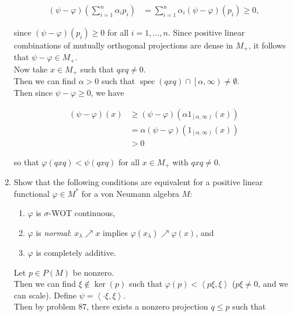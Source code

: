 \documentclass[a4paper,10pt]{report}
\DeclareMathOperator{\spec}{spec} %
\begin{document}
\begin{enumerate}
		\begin{align*}
				\left( \psi - \varphi \right) \left( \sum_{i = 1}^n \alpha_i p_i \right)%
				&= \sum_{i = 1}^n \alpha_i \left( \psi - \varphi \right) \left( p_i \right) \geq 0,
		\end{align*}

		since $\left( \psi - \varphi \right) \left( p_i \right) \geq 0$ for all $i = 1 , \ldots , n$.  Since positive linear combinations of mutually orthogonal projections are dense in $M_+$, it follows that $\psi - \varphi \in M_+$.\\
		Now take $x \in M_+$ such that $q x q \neq 0$.\\
		Then we can find $\alpha > 0$ such that $\spec \left( q x q \right) \cap \left[ \alpha , \infty \right) \neq \emptyset$.\\
		Then since $\psi - \varphi \geq 0$, we have

		\begin{align*}
				\left( \psi - \varphi \right) \left( x \right)%
				&\geq \left( \psi - \varphi \right) \left( \alpha 1_{\left[ \alpha , \infty \right)} \left( x \right) \right)\\
				&= \alpha \left( \psi - \varphi \right) \left( 1_{\left[ \alpha , \infty \right)} \left( x \right) \right)\\
				&> 0
		\end{align*}

		so that $\varphi \left( q x q \right) < \psi \left( q x q \right)$ for all $x \in M_+$ with $q x q \neq 0$.\\

	\item
		Show that the following conditions are equivalent for a positive linear functional $\varphi \in M^*$ for a von Neumann algebra $M$:

		\begin{enumerate}
		\item $\varphi$ is $\sigma$-WOT continuous,
		\item $\varphi$ is \textit{normal}: $x_\lambda \nearrow x$ implies $\varphi \left( x_\lambda \right) \nearrow \varphi \left( x \right)$, and
		\item $\varphi$ is completely additive.
		\end{enumerate}

		\proof
		Let $p \in P \left( M \right)$ be nonzero.\\
		Then we can find $\xi \notin \ker \left( p \right)$ such that $\varphi \left( p \right) < \left\langle p \xi , \xi \right\rangle$ ($p \xi \neq 0$, and we can scale).  Define $\psi = \left\langle \cdot \xi , \xi \right\rangle$.\\
		Then by problem 87, there exists a nonzero projection $q \leq p$ such that


\end{enumerate}
\end{document}
